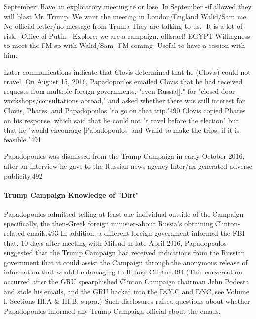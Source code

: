 
September: Have an exploratory meeting te or lose. In September -if allowed they will blast Mr. Trump. We want the meeting in London/England Walid/Sam me No official letter/no message from Trump They are talking to us. -It is a lot of risk. -Office of Putin. -Explore: we are a campaign. offlsrael! EGYPT Willingness to meet the FM sp with Walid/Sam -FM coming -Useful to have a  session with him.

Later communications indicate that Clovis determined that he (Clovis) could not travel. On August 15, 2016, Papadopoulos emailed Clovis that he had received requests from multiple foreign governments, "even Russia[],"  for "closed door workshops/consultations abroad,"  and asked whether there was still interest for Clovis, Phares, and Papadopoulos "to go on that trip."490 Clovis copied Phares on his response, which said that he could not "t ravel before the election" but that he "would encourage [Papadopoulos] and Walid to make the trips, if it is feasible."491

Papadopoulos was dismissed from the Trump Campaign in early October 2016, after an interview he gave to the Russian news agency Inter/ax generated adverse publicity.492

\paragraph{Trump Campaign Knowledge of "Dirt"}

Papadopoulos admitted telling at least one individual outside of the Campaign-specifically, the then-Greek foreign minister-about Russia's obtaining Clinton-related emails.493 In addition, a  different foreign government informed the FBI that, 10 days after meeting with Mifsud in late April 2016,  Papadopoulos suggested that the Trump Campaign had received indications from the Russian government that it could assist the Campaign through the anonymous release of information that would be damaging to Hillary Clinton.494 (This conversation occurred after the GRU spearphished Clinton Campaign chairman John Podesta and stole his emails, and the GRU hacked into the DCCC and DNC, see Volume l,  Sections III.A & III.B, supra.) Such disclosures raised questions about whether Papadopoulos informed any Trump Campaign official about the emails.

